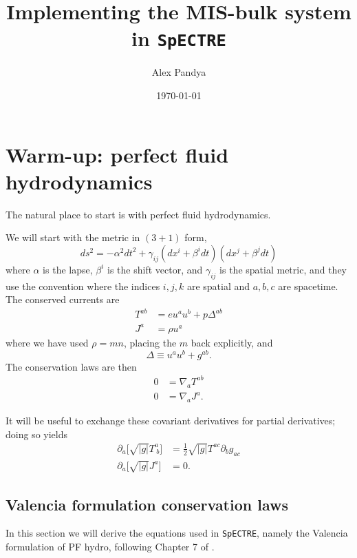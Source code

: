 \documentclass[12pt]{article}
\numberwithin{equation}{section}
\begin{document}
\title{Implementing the MIS-bulk system in {\tt SpECTRE}}
\author{Alex Pandya}
\date{\today}
\maketitle

\section{Warm-up: perfect fluid hydrodynamics}

The natural place to start is with perfect fluid hydrodynamics.

We will start with the metric in $(3+1)$ form,
\begin{equation}
ds^2 = - \alpha^2 dt^2 + \gamma_{ij} (dx^i + \beta^i dt) (dx^j + \beta^j dt)
\end{equation}
where $\alpha$ is the lapse, $\beta^{i}$ is the shift vector, and $\gamma_{ij}$
is the spatial metric, and they use the convention where the indices $i,j,k$
are spatial and $a,b,c$ are spacetime.
The conserved currents are
\begin{align}
T^{ab} &= e u^a u^b + p \Delta^{ab} \\
J^{a} &= \rho u^a
\end{align}
where we have used $\rho = m n$, placing the $m$ back explicitly, and
\begin{equation}
\Delta \equiv u^a u^b + g^{ab}.
\end{equation}
The conservation laws are then
\begin{align}
0 &= \nabla_{a} T^{ab} \\
0 &= \nabla_{a} J^{a}.
\end{align}

It will be useful to exchange these covariant derivatives for partial derivatives; doing so yields
\begin{align}
\partial_a \big[ \sqrt{|g|} T^{a}_{~b} \big] &= \frac{1}{2} \sqrt{|g|} T^{ac} \partial_{b} g_{ac} \\
\partial_a \big[ \sqrt{|g|} J^{a} \big] &= 0.
\end{align}

\subsection{Valencia formulation conservation laws}

In this section we will derive the equations used in {\tt SpECTRE}, namely the Valencia formulation of PF hydro, following Chapter 7 of \cite{RezzollaZanotti}.
\end{document}
